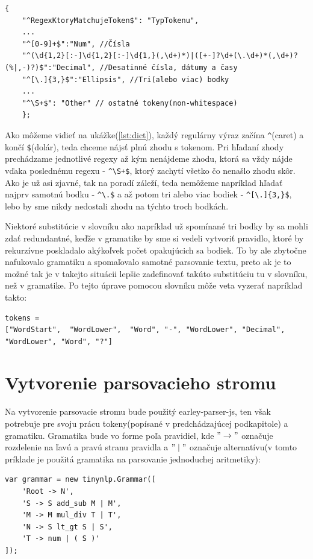 \documentclass[12pt,a4paper]{report}
\theoremstyle{definition}
\theoremstyle{remark}
\begin{document}
\begin{lstlisting}[caption={Formát slovníku a príklad substitúcie},label={lst:dict},style=htmlcssjs]
	{
	"^RegexKtoryMatchujeToken$": "TypTokenu",
	...
	"^[0-9]+$":"Num", //Čísla
	"^(\d{1,2}[:-]\d{1,2}[:-]\d{1,}(,\d+)*)|([+-]?\d+(\.\d+)*(,\d+)?(%|,-)?)$":"Decimal", //Desatinné čísla, dátumy a časy
	"^[\.]{3,}$":"Ellipsis", //Tri(alebo viac) bodky
	...
	"^\S+$": "Other" // ostatné tokeny(non-whitespace)
	};
\end{lstlisting}
\bigskip
Ako môžeme vidieť na ukážke(\ref{lst:dict}), každý regulárny výraz začína \verb!^!(caret) a končí \verb!$!(dolár), teda chceme nájsť plnú zhodu s tokenom. Pri hľadaní zhody prechádzame jednotlivé regexy až kým nenájdeme zhodu, ktorá sa vždy nájde vďaka poslednému regexu - \verb!^\S+$!, ktorý zachytí všetko čo nenašlo zhodu skôr. Ako je už asi zjavné, tak na poradí záleží, teda nemôžeme napríklad hľadať najprv samotnú bodku - \verb!^\.$! a až potom tri alebo viac bodiek -  \verb!^[\.]{3,}$!, lebo by sme nikdy nedostali zhodu na týchto troch bodkách.

 Niektoré substitúcie v slovníku ako napríklad už spomínané tri bodky by sa mohli zdať redundantné, keďže v gramatike by sme si vedeli vytvoriť pravidlo, ktoré by rekurzívne poskladalo akýkoľvek počet opakujúcich sa bodiek. To by ale zbytočne nafukovalo gramatiku a spomaľovalo samotné parsovanie textu, preto ak je to možné tak je v takejto situácii lepšie zadefinovať takúto substitúciu tu v slovníku, než v gramatike.
\bigskip
\noindent Po tejto úprave pomocou slovníku môže veta vyzerať napríklad takto:
\begin{lstlisting}[caption={Tokeny po použití slovníku},style=htmlcssjs]
tokens = 
["WordStart",  "WordLower",  "Word", "-", "WordLower", "Decimal", "WordLower", "Word", "?"]
\end{lstlisting}

\section{Vytvorenie parsovacieho stromu}
Na vytvorenie parsovacie stromu bude použitý earley-parser-js, ten však potrebuje pre svoju prácu tokeny(popísané v predchádzajúcej podkapitole) a gramatiku. Gramatika bude vo forme poľa pravidiel, kde $"\to"$ označuje rozdelenie na ľavú a pravú stranu pravidla a $"\mid"$ označuje alternatívu(v tomto príklade je použitá gramatika na parsovanie jednoduchej aritmetiky):

\begin{lstlisting}[caption={Ukážková gramatika},label={lst:gramatika},style=htmlcssjs]
var grammar = new tinynlp.Grammar([
    'Root -> N',
    'S -> S add_sub M | M',
    'M -> M mul_div T | T',
    'N -> S lt_gt S | S',
    'T -> num | ( S )'
]);
\end{lstlisting}
\end{document}
